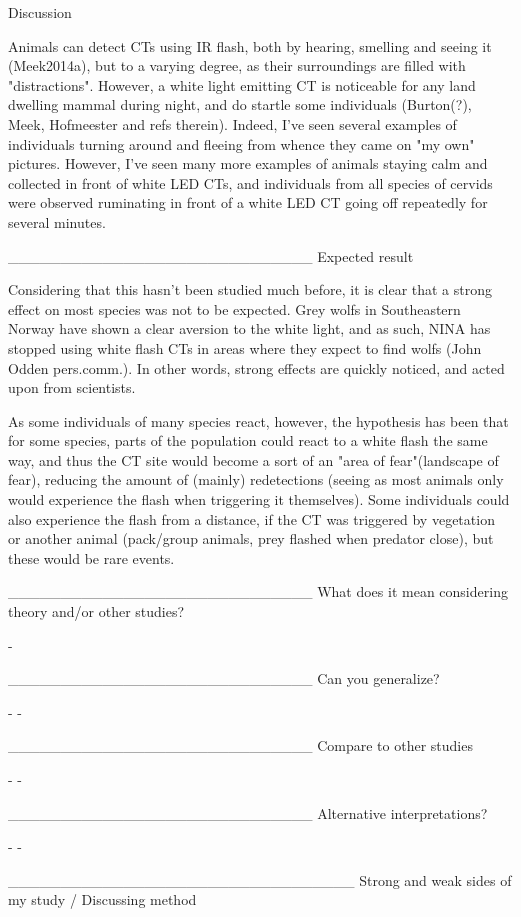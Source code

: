 
Discussion

Animals can detect CTs using IR flash, both by hearing, smelling and seeing it (Meek2014a), but to a varying degree, as their surroundings are filled with "distractions". However, a white light emitting CT is noticeable for any land dwelling mammal during night, and do startle some individuals (Burton(?), Meek, Hofmeester and refs therein). 
Indeed, I've seen several examples of individuals turning around and fleeing from whence they came on "my own" pictures. However, I've seen many more examples of animals staying calm and collected in front of white LED CTs, and individuals from all species of cervids were observed ruminating in front of a white LED CT going off repeatedly for several minutes.


_____________________________
Expected result

Considering that this hasn't been studied much before, it is clear that a strong effect on most species was not to be expected.
Grey wolfs in Southeastern Norway have shown a clear aversion to the white light, and as such, NINA has stopped using white flash CTs in areas where they expect to find wolfs (John Odden pers.comm.). In other words, strong effects are quickly noticed, and acted upon from scientists.

As some individuals of many species react, however, the hypothesis has been that for some species, parts of the population could react to a white flash the same way, and thus the CT site would become a sort of an "area of fear"(landscape of fear), reducing the amount of (mainly) redetections (seeing as most animals only would experience the flash when triggering it themselves).
Some individuals could also experience the flash from a distance, if the CT was triggered by vegetation or another animal (pack/group animals, prey flashed when predator close), but these would be rare events.

_____________________________
What does it mean considering theory and/or other studies?

-

_____________________________
Can you generalize?

-
-

_____________________________
Compare to other studies

-
-

_____________________________
Alternative interpretations?

-
-

_________________________________
Strong and weak sides of my study
/ Discussing method

